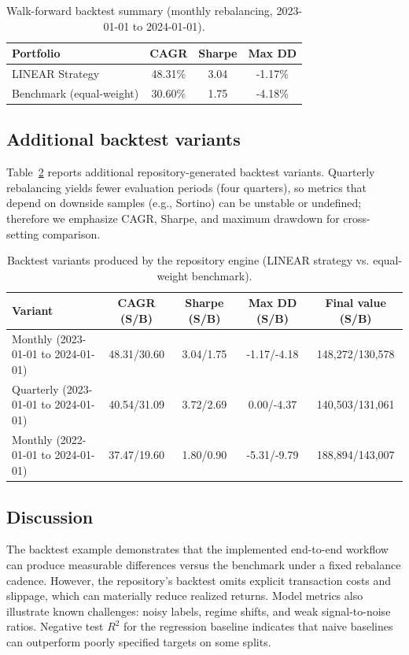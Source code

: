 \documentclass[conference]{IEEEtran}
\begin{document}
\begin{table}[!t]
\centering
\caption{Walk-forward backtest summary (monthly rebalancing, 2023-01-01 to 2024-01-01).}
\label{tab:backtest}
\small
\setlength{\tabcolsep}{4pt}
\renewcommand{\arraystretch}{1.15}
\begin{tabularx}{\columnwidth}{|X|c|c|c|}
\hline
\textbf{Portfolio} & \textbf{CAGR} & \textbf{Sharpe} & \textbf{Max DD} \\
\hline
LINEAR Strategy & 48.31\% & 3.04 & -1.17\% \\
Benchmark (equal-weight) & 30.60\% & 1.75 & -4.18\% \\
\hline
\end{tabularx}
\end{table}

\subsection{Additional backtest variants}
Table~\ref{tab:variants} reports additional repository-generated backtest variants. Quarterly rebalancing yields fewer evaluation periods (four quarters), so metrics that depend on downside samples (e.g., Sortino) can be unstable or undefined; therefore we emphasize CAGR, Sharpe, and maximum drawdown for cross-setting comparison.

\begin{table}[!t]
\centering
\caption{Backtest variants produced by the repository engine (LINEAR strategy vs. equal-weight benchmark).}
\label{tab:variants}
\small
\renewcommand{\arraystretch}{1.15}
\setlength{\tabcolsep}{5pt}
\begin{tabularx}{\textwidth}{|X|c|c|c|c|}
\hline
\textbf{Variant} & \textbf{CAGR (S/B)} & \textbf{Sharpe (S/B)} & \textbf{Max DD (S/B)} & \textbf{Final value (S/B)}\\
\hline
Monthly (2023-01-01 to 2024-01-01) & 48.31/30.60 & 3.04/1.75 & -1.17/-4.18 & 148,272/130,578\\
Quarterly (2023-01-01 to 2024-01-01) & 40.54/31.09 & 3.72/2.69 & 0.00/-4.37 & 140,503/131,061\\
Monthly (2022-01-01 to 2024-01-01) & 37.47/19.60 & 1.80/0.90 & -5.31/-9.79 & 188,894/143,007\\
\hline
\end{tabularx}
\end{table}

\subsection{Discussion}
The backtest example demonstrates that the implemented end-to-end workflow can produce measurable differences versus the benchmark under a fixed rebalance cadence. However, the repository's backtest omits explicit transaction costs and slippage, which can materially reduce realized returns. Model metrics also illustrate known challenges: noisy labels, regime shifts, and weak signal-to-noise ratios. Negative test $R^2$ for the regression baseline indicates that naive baselines can outperform poorly specified targets on some splits.
\end{document}
